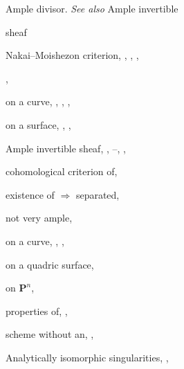 {{\noindent\hspace*{0.0bp}Ample divisor. \emph{See also} Ample invertible\par
\noindent\hspace*{15.0bp}sheaf\par
\noindent\hspace*{7.5bp}Nakai--Moishezon criterion, , , ,\par
\noindent\hspace*{15.0bp}, \par
\noindent\hspace*{7.5bp}on a curve, , , , \par
\noindent\hspace*{7.5bp}on a surface, , , \par
\noindent\hspace*{0.0bp}Ample invertible sheaf, , --, ,\par
\noindent\hspace*{15.0bp}\par
\noindent\hspace*{7.5bp}cohomological criterion of, \par
\noindent\hspace*{7.5bp}existence of $\Rightarrow$ separated, \par
\noindent\hspace*{7.5bp}not very ample, \par
\noindent\hspace*{7.5bp}on a curve, , , \par
\noindent\hspace*{7.5bp}on a quadric surface, \par
\noindent\hspace*{7.5bp}on $\mathbf P^n$, \par
\noindent\hspace*{7.5bp}properties of, , \par
\noindent\hspace*{7.5bp}scheme without an, , \par
\noindent\hspace*{0.0bp}Analytically isomorphic singularities, ,\par
}}
